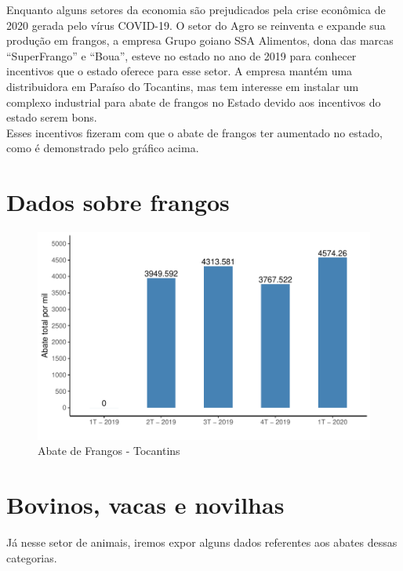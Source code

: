 \par Enquanto alguns setores da economia são prejudicados pela crise econômica de 2020 gerada pelo vírus COVID-19. O setor do Agro se reinventa e expande sua produção em frangos, a empresa Grupo goiano SSA Alimentos, dona das marcas “SuperFrango” e “Boua”, esteve no estado no ano de 2019 para conhecer incentivos que o estado oferece para esse setor. A empresa mantém uma distribuidora em Paraíso do Tocantins, mas tem interesse em instalar um complexo industrial para abate de frangos no Estado devido aos incentivos do estado serem bons. \\
Esses incentivos fizeram com que o abate de frangos ter aumentado no estado, como é demonstrado pelo gráfico acima.

\section{Dados sobre frangos}
\begin{figure}[h]
	\caption{Abate de Frangos - Tocantins}
	\includegraphics[width=\linewidth]{fig/Abate de frangos.pdf}
\end{figure}

\section{Bovinos, vacas e novilhas}

\par Já nesse setor de animais, iremos expor alguns dados referentes aos abates dessas categorias.

